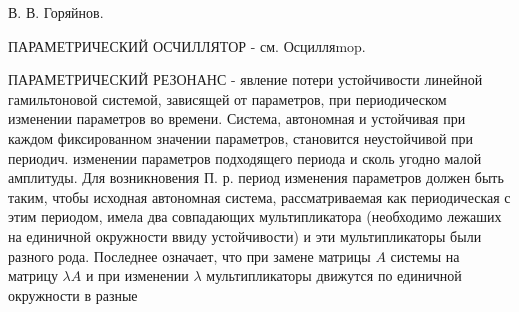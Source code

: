 \documentclass[10pt]{article}
\begin{document}
В. В. Горяйнов.



ПАРАМЕТРИЧЕСКИЙ ОСЧИЛЛЯТОР - см. Осцилляmop.



ПАРАМЕТРИЧЕСКИЙ РЕЗОНАНС - явление потери устойчивости линейной гамильтоновой системой, зависящей от параметров, при периодическом изменении параметров во времени. Система, автономная и устойчивая при каждом фиксированном значении параметров, становится неустойчивой при периодич. изменении параметров подходящего периода и сколь угодно малой амплитуды. Для возникновения П. р. период изменения параметров должен быть таким, чтобы исходная автономная система, рассматриваемая как периодическая с этим периодом, имела два совпадающих мультипликатора (необходимо лежаших на единичной окружности ввиду устойчивости) и эти мультипликаторы были разного рода. Последнее означает, что при замене матрицы $A$ системы на матрицу $\lambda A$ и при изменении $\lambda$ мультипликаторы движутся по единичной окружности в разные
\end{document}
